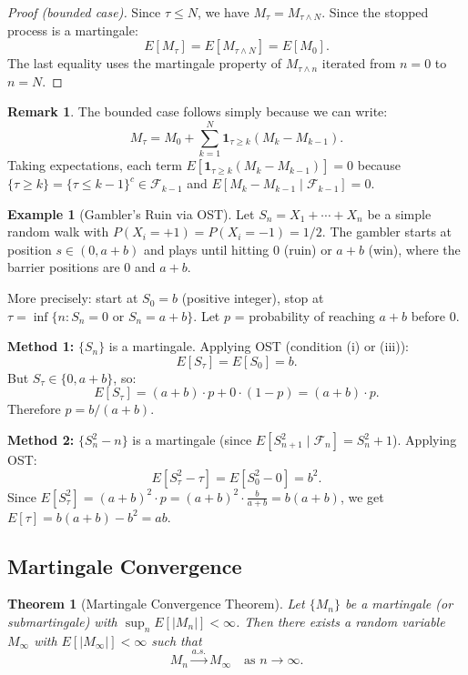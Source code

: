 \documentclass[12pt, a4paper]{article}
\theoremstyle{definition}
\newtheorem{example}{Example}[section]
\newtheorem{remark}{Remark}[section]
\theoremstyle{plain}
\newtheorem{theorem}{Theorem}[section]
\begin{document}
\begin{proof}[Proof (bounded case)]
Since $\tau \leq N$, we have $M_\tau = M_{\tau \wedge N}$. Since the stopped process is a martingale:
\[
  E[M_\tau] = E[M_{\tau \wedge N}] = E[M_0].
\]
The last equality uses the martingale property of $M_{\tau \wedge n}$ iterated from $n=0$ to $n=N$.
\end{proof}

\begin{remark}
The bounded case follows simply because we can write:
\[
  M_\tau = M_0 + \sum_{k=1}^{N} \mathbf{1}_{\tau \geq k}(M_k - M_{k-1}).
\]
Taking expectations, each term $E[\mathbf{1}_{\tau \geq k}(M_k - M_{k-1})] = 0$ because $\{\tau \geq k\} = \{\tau \leq k-1\}^c \in \mathcal{F}_{k-1}$ and $E[M_k - M_{k-1} \mid \mathcal{F}_{k-1}] = 0$.
\end{remark}

\begin{example}[Gambler's Ruin via OST]
Let $S_n = X_1 + \cdots + X_n$ be a simple random walk with $P(X_i = +1) = P(X_i = -1) = 1/2$. The gambler starts at position $s \in (0, a+b)$ and plays until hitting $0$ (ruin) or $a+b$ (win), where the barrier positions are $0$ and $a+b$.

More precisely: start at $S_0 = b$ (positive integer), stop at $\tau = \inf\{n : S_n = 0 \text{ or } S_n = a+b\}$. Let $p$ = probability of reaching $a+b$ before $0$.

\textbf{Method 1:} $\{S_n\}$ is a martingale. Applying OST (condition (i) or (iii)):
\[
  E[S_\tau] = E[S_0] = b.
\]
But $S_\tau \in \{0, a+b\}$, so:
\[
  E[S_\tau] = (a+b) \cdot p + 0 \cdot (1-p) = (a+b) \cdot p.
\]
Therefore $p = b/(a+b)$.

\textbf{Method 2:} $\{S_n^2 - n\}$ is a martingale (since $E[S_{n+1}^2 \mid \mathcal{F}_n] = S_n^2 + 1$). Applying OST:
\[
  E[S_\tau^2 - \tau] = E[S_0^2 - 0] = b^2.
\]
Since $E[S_\tau^2] = (a+b)^2 \cdot p = (a+b)^2 \cdot \frac{b}{a+b} = b(a+b)$, we get $E[\tau] = b(a+b) - b^2 = ab$.
\end{example}

\subsection{Martingale Convergence}

\begin{theorem}[Martingale Convergence Theorem]
Let $\{M_n\}$ be a martingale (or submartingale) with $\sup_n E[|M_n|] < \infty$. Then there exists a random variable $M_\infty$ with $E[|M_\infty|] < \infty$ such that
\[
  M_n \xrightarrow{a.s.} M_\infty \quad \text{as } n \to \infty.
\]
\end{theorem}
\end{document}
